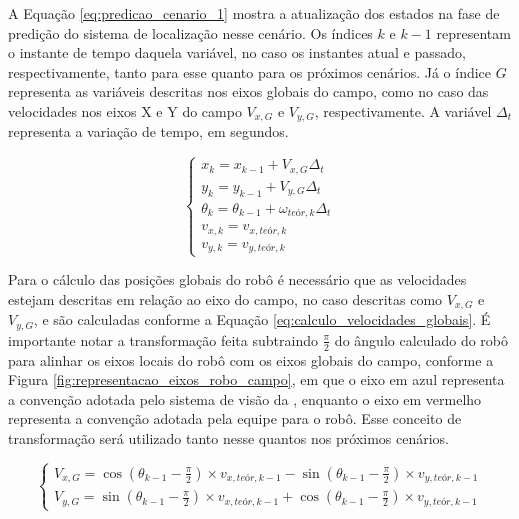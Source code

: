 \documentclass[acronym, symbols, table]{fei}
\begin{document}
				A Equação \eqref{eq:predicao_cenario_1} mostra a atualização dos estados na fase de predição do sistema de localização nesse cenário. Os índices $k$ e $k-1$ representam o instante de tempo daquela variável, no caso os instantes atual e passado, respectivamente, tanto para esse quanto para os próximos cenários. Já o índice $G$ representa as variáveis descritas nos eixos globais do campo, como no caso das velocidades nos eixos X e Y do campo $V_{x,G}$ e $V_{y,G}$, respectivamente. A variável $\Delta_t$ representa a variação de tempo, em segundos.
				
				\begin{equation}\label{eq:predicao_cenario_1}
					\begin{cases}
						x_{k} = x_{k-1} + V_{x,G} \Delta_t \\
						y_{k} = y_{k-1} + V_{y,G} \Delta_t  \\
						\theta_{k} = \theta_{k-1} + \omega_{teór,k} \Delta_t \\
						v_{x,k} = v_{x,teór,k}\\
						v_{y,k} = v_{y,teór,k}
					\end{cases}
				\end{equation}
			
			Para o cálculo das posições globais do robô é necessário que as velocidades estejam descritas em relação ao eixo do campo, no caso descritas como $V_{x,G}$ e $V_{y,G}$, e são calculadas conforme a Equação \eqref{eq:calculo_velocidades_globais}. É importante notar a transformação feita subtraindo $\frac{\pi}{2}$ do ângulo calculado do robô para alinhar os eixos locais do robô com os eixos globais do campo, conforme a Figura \ref{fig:representacao_eixos_robo_campo}, em que o eixo em azul representa a convenção adotada pelo sistema de visão da , enquanto o eixo em vermelho representa a convenção adotada pela equipe para o robô. Esse conceito de transformação será utilizado tanto nesse quantos nos próximos cenários.
			
				\begin{equation}\label{eq:calculo_velocidades_globais}
					\begin{cases}
						V_{x,G} = \cos(\theta_{k-1} - \frac{\pi}{2}) \times v_{x,teór,k-1} - \sin(\theta_{k-1} - \frac{\pi}{2}) \times v_{y,teór,k-1} \\
						V_{y,G} = \sin(\theta_{k-1} - \frac{\pi}{2}) \times v_{x,teór,k-1} + \cos(\theta_{k-1} - \frac{\pi}{2}) \times v_{y,teór,k-1}
					\end{cases}
				\end{equation}
			
\end{document}
